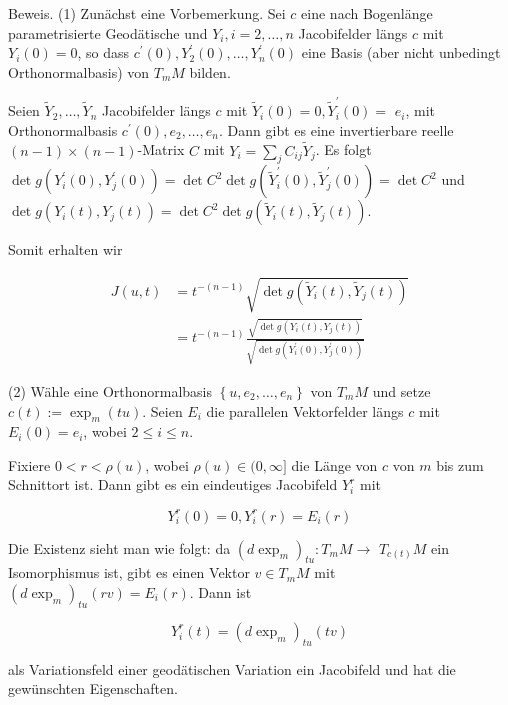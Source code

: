 \documentclass[10pt, letterpaper]{article}
\begin{document}
Beweis. (1) Zunächst eine Vorbemerkung. Sei $c$ eine nach Bogenlänge parametrisierte Geodätische und $Y_{i}, i=2, \ldots, n$ Jacobifelder längs $c$ mit $Y_{i}(0)=0$, so dass $c^{\prime}(0), Y_{2}^{\prime}(0), \ldots, Y_{n}^{\prime}(0)$ eine Basis (aber nicht unbedingt Orthonormalbasis) von $T_{m} M$ bilden.

Seien $\tilde{Y}_{2}, \ldots, \tilde{Y}_{n}$ Jacobifelder längs $c$ mit $\tilde{Y}_{i}(0)=0, \tilde{Y}_{i}^{\prime}(0)=$ $e_{i}$, mit Orthonormalbasis $c^{\prime}(0), e_{2}, \ldots, e_{n}$. Dann gibt es eine invertierbare reelle $(n-1) \times(n-1)$-Matrix $C$ mit $Y_{i}=\sum_{j} C_{i j} \tilde{Y}_{j}$. Es folgt $\operatorname{det} g\left(Y_{i}^{\prime}(0), Y_{j}^{\prime}(0)\right)=\operatorname{det} C^{2} \operatorname{det} g\left(\tilde{Y}_{i}^{\prime}(0), \tilde{Y}_{j}^{\prime}(0)\right)=\operatorname{det} C^{2}$ und $\operatorname{det} g\left(Y_{i}(t), Y_{j}(t)\right)=\operatorname{det} C^{2} \operatorname{det} g\left(\tilde{Y}_{i}(t), \tilde{Y}_{j}(t)\right)$.

Somit erhalten wir

$$
\begin{aligned}
J(u, t) & =t^{-(n-1)} \sqrt{\operatorname{det} g\left(\tilde{Y}_{i}(t), \tilde{Y}_{j}(t)\right)} \\
& =t^{-(n-1)} \frac{\sqrt{\operatorname{det} g\left(Y_{i}(t), Y_{j}(t)\right)}}{\sqrt{\operatorname{det} g\left(Y_{i}^{\prime}(0), Y_{j}^{\prime}(0)\right)}}
\end{aligned}
$$

(2) Wähle eine Orthonormalbasis $\left\{u, e_{2}, \ldots, e_{n}\right\}$ von $T_{m} M$ und setze $c(t):=\exp _{m}(t u)$. Seien $E_{i}$ die parallelen Vektorfelder längs $c$ mit $E_{i}(0)=e_{i}$, wobei $2 \leq i \leq n$.

Fixiere $0<r<\rho(u)$, wobei $\rho(u) \in(0, \infty]$ die Länge von $c$ von $m$ bis zum Schnittort ist. Dann gibt es ein eindeutiges Jacobifeld $Y_{i}^{r}$ mit

$$
Y_{i}^{r}(0)=0, Y_{i}^{r}(r)=E_{i}(r)
$$

Die Existenz sieht man wie folgt: da $\left(d \exp _{m}\right)_{t u}: T_{m} M \rightarrow$ $T_{c(t)} M$ ein Isomorphismus ist, gibt es einen Vektor $v \in T_{m} M$ mit $\left(d \exp _{m}\right)_{t u}(r v)=E_{i}(r)$. Dann ist

$$
Y_{i}^{r}(t)=\left(d \exp _{m}\right)_{t u}(t v)
$$

als Variationsfeld einer geodätischen Variation ein Jacobifeld und hat die gewünschten Eigenschaften.
\end{document}
